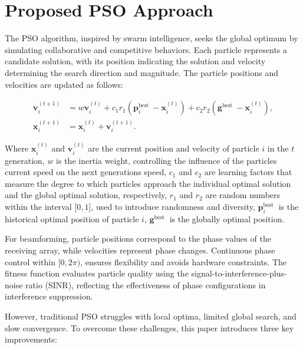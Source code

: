 \documentclass[lettersize,journal]{IEEEtran}
\begin{document}
\section{Proposed PSO Approach}

The PSO algorithm, inspired by swarm intelligence, seeks the global optimum by simulating collaborative and competitive behaviors\cite{kennedy1995particle}. Each particle represents a candidate solution, with its position indicating the solution and velocity determining the search direction and magnitude. The particle positions and velocities are updated as follows:

\begin{equation}
  \begin{aligned}
    \mathbf{v}_{i}^{(t + 1)} & = w\mathbf{v}_{i}^{(t)} + c_{1}r_{1}\left( \mathbf{p}_{i}^{\text{best~}} - \mathbf{x}_{i}^{(t)} \right) + c_{2}r_{2}\left( \mathbf{g}^{\text{best~}} - \mathbf{x}_{i}^{(t)} \right), \\
    \mathbf{x}_{i}^{(t + 1)} & = \mathbf{x}_{i}^{(t)} + \mathbf{v}_{i}^{(t + 1)}.
  \end{aligned}
  \label{eq:position_velocity_update}
\end{equation}

Where \(\mathbf{x}_{i}^{(t)}\) and \(\mathbf{v}_{i}^{(t)}\) are the current position and velocity of particle \(i\) in the \(t\) generation, \(w\) is the inertia weight, controlling the influence of the
particle\textquotesingle s current speed on the next
generation\textquotesingle s speed, \(c_{1}\) and \(c_{2}\) are learning factors that measure the degree to which particles approach the individual optimal solution and the global optimal solution, respectively, \(r_{1}\) and \(r_{2}\) are random numbers within the interval \(\lbrack 0,1\rbrack\), used to introduce randomness and diversity, \(\mathbf{p}_{i}^{\text{best~}}\) is the historical optimal
position of particle \(i\), \(\mathbf{g}^{\text{best~}}\) is the globally optimal position.

For beamforming, particle positions correspond to the phase values of the receiving array, while velocities represent phase changes. Continuous phase control within \(\lbrack 0,2\pi)\), ensures flexibility and avoids hardware constraints. The fitness function evaluates particle quality using the signal-to-interference-plus-noise ratio (SINR), reflecting the effectiveness of phase configurations in interference suppression.

However, traditional PSO struggles with local optima, limited global search, and slow convergence. To overcome these challenges, this paper introduces three key improvements:
\end{document}
